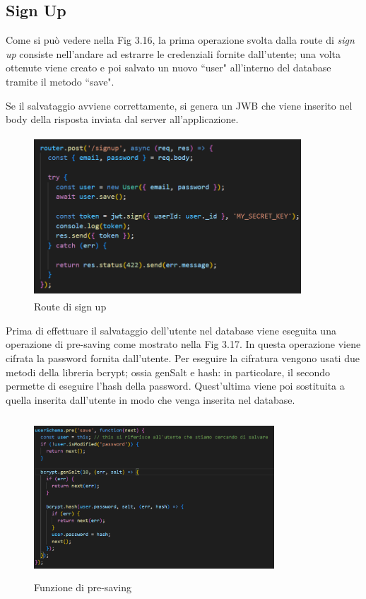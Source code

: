 \subsection*{Sign Up}
Come si pu\`o vedere nella Fig 3.16, la prima operazione svolta dalla route di \textit{sign up} consiste nell'andare ad estrarre le credenziali
fornite dall'utente; una volta ottenute viene creato e poi salvato un nuovo ``user" all'interno del database tramite il metodo ``save".

Se il salvataggio avviene correttamente, si genera un JWB che viene inserito nel body della risposta inviata dal server all'applicazione.
\begin{figure}[h]
    \centering
    \includegraphics[width=10cm, height=6cm]{images/signUpServer.png}
    \caption[differenzeiteot]{Route di sign up}
    \label{fig:sign up}
\end{figure}

Prima di effettuare il salvataggio dell'utente nel database viene eseguita una operazione di pre-saving come mostrato nella Fig 3.17. In questa operazione viene cifrata la password fornita dall'utente.
Per eseguire la cifratura vengono usati due metodi della libreria bcrypt; ossia genSalt e hash: in particolare, il secondo permette di eseguire l'hash
della password. Quest'ultima viene poi sostituita a quella inserita dall'utente in modo che venga inserita nel database.

\begin{figure}[h]
    \centering
    \includegraphics[width=9cm, height=6cm]{images/preSaveFunction.png}
    \caption[differenzeiteot]{Funzione di pre-saving}
    \label{fig:pre-saving}
\end{figure}


